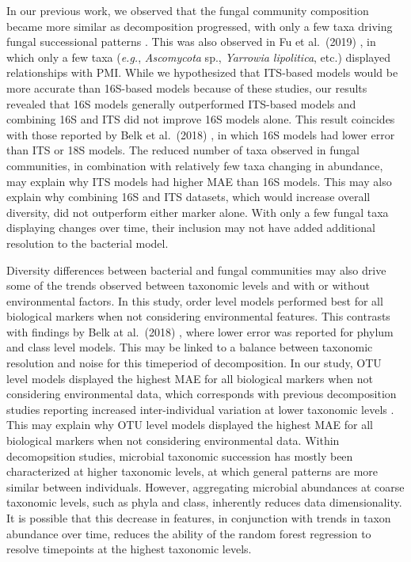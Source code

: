 \documentclass[
  10pt,
  letterpaper,
]{article}
\begin{document}
In our previous work, we observed that the fungal community composition
became more similar as decomposition progressed, with only a few taxa
driving fungal successional patterns \citep{mason_body_2022}. This was
also observed in Fu et al.~(2019) \citep{fu_fungal_2019}, in which only
a few taxa (\emph{e.g.}, \emph{Ascomycota} sp., \emph{Yarrowia
lipolitica}, etc.) displayed relationships with PMI. While we
hypothesized that ITS-based models would be more accurate than 16S-based
models because of these studies, our results revealed that 16S models
generally outperformed ITS-based models and combining 16S and ITS did
not improve 16S models alone. This result coincides with those reported
by Belk et al.~(2018) \citep{belk_microbiome_2018}, in which 16S models
had lower error than ITS or 18S models. The reduced number of taxa
observed in fungal communities, in combination with relatively few taxa
changing in abundance, may explain why ITS models had higher MAE than
16S models. This may also explain why combining 16S and ITS datasets,
which would increase overall diversity, did not outperform either marker
alone. With only a few fungal taxa displaying changes over time, their
inclusion may not have added additional resolution to the bacterial
model.

Diversity differences between bacterial and fungal communities may also
drive some of the trends observed between taxonomic levels and with or
without environmental factors. In this study, order level models
performed best for all biological markers when not considering
environmental features. This contrasts with findings by Belk at
al.~(2018) \citep{belk_microbiome_2018}, where lower error was reported
for phylum and class level models. This may be linked to a balance
between taxonomic resolution and noise for this timeperiod of
decomposition. In our study, OTU level models displayed the highest MAE
for all biological markers when not considering environmental data,
which corresponds with previous decomposition studies reporting
increased inter-individual variation at lower taxonomic levels
\citep{metcalf_microbial_2016, mason_body_2022, taylor_soil_2024}. This
may explain why OTU level models displayed the highest MAE for all
biological markers when not considering environmental data. Within
decomopsition studies, microbial taxonomic succession has mostly been
characterized at higher taxonomic levels, at which general patterns are
more similar between individuals. However, aggregating microbial
abundances at coarse taxonomic levels, such as phyla and class,
inherently reduces data dimensionality. It is possible that this
decrease in features, in conjunction with trends in taxon abundance over
time, reduces the ability of the random forest regression to resolve
timepoints at the highest taxonomic levels.
\end{document}
